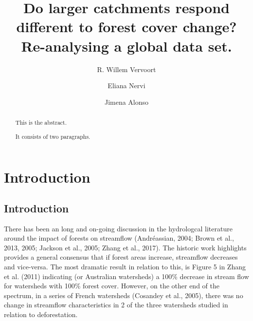 \documentclass[]{elsarticle} %
\begin{document}
\begin{frontmatter}

  \title{Do larger catchments respond different to forest cover change?
Re-analysing a global data set.}
    \author[The University of Sydney, INIA]{R. Willem Vervoort}
    \author[INIA]{Eliana Nervi}
    \author[IMFIA]{Jimena Alonso}
      \address[The University of Sydney]{School of Life and Environmental Sciences, The University of Sydney,
Sydney, NSW 2006, Australia}
    \address[INIA]{INIA, Uruguay}
    \address[IMFIA]{Institute of Fluid Mechanics and Environmental Engineering, School of
Engineering, Universidad de la República, 11200 Montevideo, Departamento
de Montevideo, Uruguay}
  
  \begin{abstract}
  This is the abstract.
  
  It consists of two paragraphs.
  \end{abstract}
  
 \end{frontmatter}

\hypertarget{introduction}{%
\section{Introduction}\label{introduction}}

\hypertarget{introduction-1}{%
\subsection{Introduction}\label{introduction-1}}

There has been an long and on-going discussion in the hydrologcal
literature around the impact of forests on streamflow (Andréassian,
2004; Brown et al., 2013, 2005; Jackson et al., 2005; Zhang et al.,
2017). The historic work highlights provides a general consensus that if
forest areas increase, streamflow decreases and vice-versa. The most
dramatic result in relation to this, is Figure 5 in Zhang et al. (2011)
indicating (or Australian watersheds) a 100\% decrease in stream flow
for watersheds with 100\% forest cover. However, on the other end of the
spectrum, in a series of French watersheds (Cosandey et al., 2005),
there was no change in streamflow characteristics in 2 of the three
watersheds studied in relation to deforestation.
\end{document}

